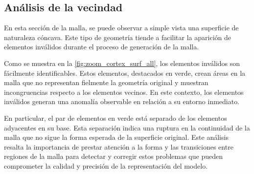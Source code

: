 
\subsection{Análisis de la vecindad}

En esta sección de la malla, se puede observar a simple vista una superficie de naturaleza cóncava. Este tipo de geometría tiende a facilitar la aparición de elementos inválidos durante el proceso de generación de la malla.

Como se muestra en la \autoref{fig:zoom_cortex_surf_all}, los elementos inválidos son fácilmente identificables. Estos elementos, destacados en verde, crean áreas en la malla que no representan fielmente la geometría original y muestran incongruencias respecto a los elementos vecinos. En este contexto, los elementos inválidos generan una anomalía observable en relación a su entorno inmediato.

En particular, el par de elementos en verde está separado de los elementos adyacentes en su base. Esta separación indica una ruptura en la continuidad de la malla que no sigue la forma esperada de la superficie original. Este análisis resalta la importancia de prestar atención a la forma y las transiciones entre regiones de la malla para detectar y corregir estos problemas que pueden comprometer la calidad y precisión de la representación del modelo.

